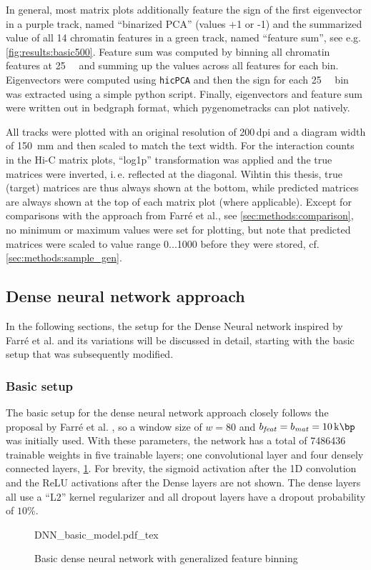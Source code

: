 In general, most matrix plots additionally feature the sign of the first eigenvector in a purple track, named ``binarized PCA'' (values +1 or -1)
and the summarized value of all 14 chromatin features in a green track, named ``feature sum'', see e.g. \cref{fig:results:basic500}.
Feature sum was computed by binning all chromatin features at \SI{25}{\kilo\bp} and 
summing up the values across all features for each bin.
Eigenvectors were computed using \texttt{hicPCA} \cite{Wolff2018} and then the sign for each \SI{25}{\kilo\bp} bin was extracted using 
a simple python script. Finally, eigenvectors and feature sum were written out in bedgraph format, which pygenometracks can plot natively.

All tracks were plotted with an original resolution of 200\,dpi and a diagram width of \SI{150}{\mm} and then scaled to match the text width.
For the interaction counts in the Hi-C matrix plots, ``log1p'' transformation was applied and the true matrices were inverted,
i.\,e. reflected at the diagonal. Wihtin this thesis, true (target) matrices are thus always shown at the bottom, while predicted matrices are always shown at the top
of each matrix plot (where applicable).
Except for comparisons with the approach from Farr\'e et al., see \cref{sec:methods:comparison},
no minimum or maximum values were set for plotting, but note that predicted matrices were scaled to value range 0...1000 
before they were stored, cf. \cref{sec:methods:sample_gen}.

\subsection{Dense neural network approach} \label{sec:methods:dnn}
In the following sections, the setup for the Dense Neural network inspired by Farr\'e et al. \cite{Farre2018a}
and its variations will be discussed in detail, starting with the basic setup that was subsequently modified.

\subsubsection{Basic setup} \label{sec:methods:basicSetup}
The basic setup for the dense neural network approach closely follows the proposal by Farr\'e et al. \cite{Farre2018a},
so a window size of $w=80$ and $b_\mathit{feat}=b_\mathit{mat} = \SI{10}{\kilo\bp}$ was initially used.
With these parameters, the network has a total of \SI{7486436}{} trainable weights in five trainable layers; 
one convolutional layer and four densely connected layers, \cref{fig:methods:basic_dnn}.
For brevity, the sigmoid activation after the 1D convolution and the ReLU activations after the Dense layers are not shown.
The dense layers all use a ``L2'' kernel regularizer and all dropout layers have a dropout probability of $10\%$.
\begin{figure}[htb]
    \small
    \centering
    {DNN_basic_model.pdf_tex}
    \caption{Basic dense neural network with generalized feature binning}
    \label{fig:methods:basic_dnn}
\end{figure}

